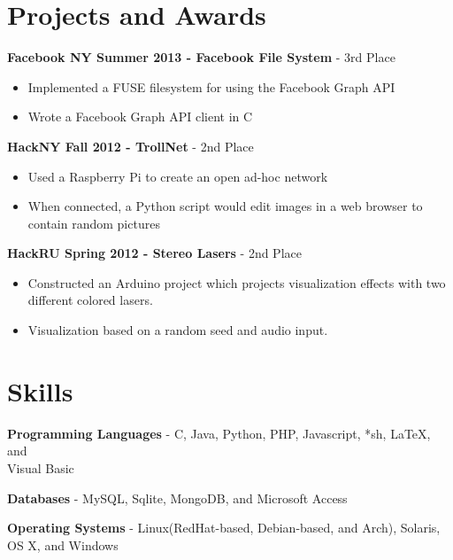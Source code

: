 \documentclass[margin]{res}
\begin{document}
\begin{resume}

\section{Projects and Awards} 

    {\bf Facebook NY Summer 2013 - Facebook File System} - 3rd
    Place
    \begin{itemize} \itemsep -2pt
        \item Implemented a FUSE filesystem for using the Facebook Graph API
        \item Wrote a Facebook Graph API client in C
    \end{itemize}

	{\bf HackNY Fall 2012 - TrollNet} - 2nd Place
	\begin{itemize} \itemsep -2pt
		\item Used a Raspberry Pi to create an open ad-hoc network
		\item When connected, a Python script would edit images in a web browser to contain random pictures
	\end{itemize}

	{\bf HackRU Spring 2012 - Stereo Lasers} - 2nd Place
	\begin{itemize} \itemsep -2pt
		\item Constructed an Arduino project which projects visualization effects with two different colored lasers.
		\item Visualization based on a random seed and audio input.
	\end{itemize}

\section{Skills}
	{\bf Programming Languages} - C, Java, Python, PHP, Javascript, *sh, LaTeX, and \\Visual Basic

	{\bf Databases} - MySQL, Sqlite, MongoDB, and Microsoft Access

	{\bf Operating Systems} - Linux(RedHat-based, Debian-based, and Arch), Solaris, OS X, and Windows


\end{resume}
\end{document}
